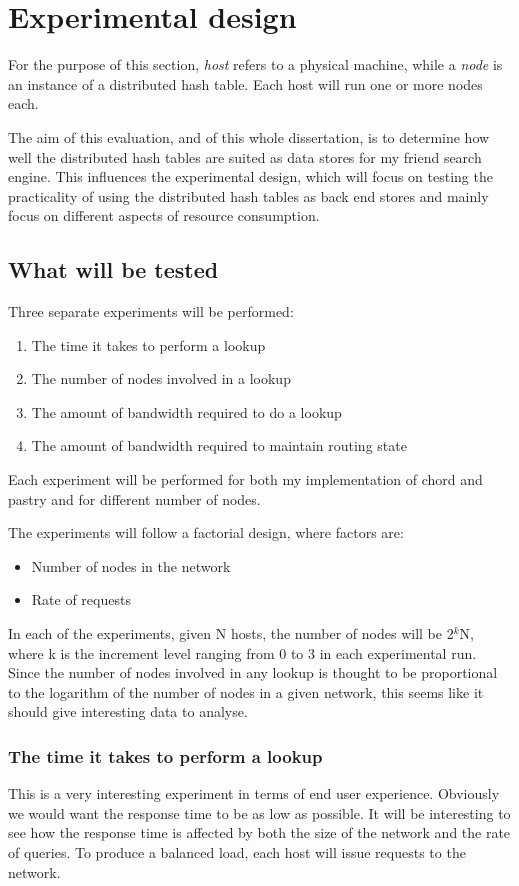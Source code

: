 \section{Experimental design}
For the purpose of this section, \textit{host} refers to a physical machine, while a \textit{node} is an instance of a distributed hash table. Each host will run one or more nodes each.

The aim of this evaluation, and of this whole dissertation, is to determine how well the distributed hash tables are suited as data stores for my friend search engine. This influences the experimental design, which will focus on testing the practicality of using the distributed hash tables as back end stores and mainly focus on different aspects of resource consumption.

\subsection{What will be tested}
Three separate experiments will be performed: 

\begin{enumerate}
\item The time it takes to perform a lookup
\item The number of nodes involved in a lookup
\item The amount of bandwidth required to do a lookup
\item The amount of bandwidth required to maintain routing state
\end{enumerate}

Each experiment will be performed for both my implementation of chord and pastry and for different number of nodes.

The experiments will follow a factorial design, where factors are:
\begin{itemize}
\item Number of nodes in the network
\item Rate of requests
\end{itemize}

In each of the experiments, given N hosts, the number of nodes will be 2$^{k}$N, where k is the increment level ranging from 0 to 3 in each experimental run. Since the number of nodes involved in any lookup is thought to be proportional to the logarithm of the number of nodes in a given network, this seems like it should give interesting data to analyse.

\subsubsection{The time it takes to perform a lookup}
This is a very interesting experiment in terms of end user experience. Obviously we would want the response time to be as low as possible. It will be interesting to see how the response time is affected by both the size of the network and the rate of queries. To produce a balanced load, each host will issue requests to the network.

